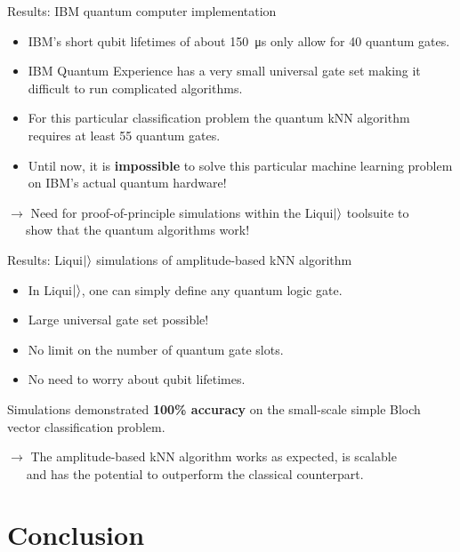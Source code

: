 \documentclass[10pt]{beamer}
\begin{document}
{
\begin{frame}{Results: IBM quantum computer implementation}

\begin{itemize}
\item IBM's short qubit lifetimes of about \SI{150}{\micro\second} only allow for 40 quantum gates.
\item IBM Quantum Experience has a very small universal gate set making it difficult to run complicated algorithms.
\item For this particular classification problem the quantum kNN algorithm requires at least 55 quantum gates.
\item Until now, it is \textbf{impossible} to solve this particular machine learning problem on IBM's actual quantum hardware!
\end{itemize}

$\rightarrow$ Need for proof-of-principle simulations within the Liqui$\ket{}$ toolsuite to\\
$\quad \,$ show that the quantum algorithms work!

\end{frame}
}

{
\begin{frame}{Results: Liqui$\ket{}$ simulations of amplitude-based kNN algorithm}

\begin{itemize}
\item In Liqui$\ket{}$, one can simply define any quantum logic gate.
\item Large universal gate set possible!
\item No limit on the number of quantum gate slots.
\item No need to worry about qubit lifetimes.
\end{itemize}

Simulations demonstrated \textbf{100\% accuracy} on the small-scale simple Bloch vector classification problem.

$\rightarrow$ The amplitude-based kNN algorithm works as expected, is scalable\\$\quad\>$ and has the potential to outperform the classical counterpart.

\end{frame}
}

\section{Conclusion}
\end{document}

